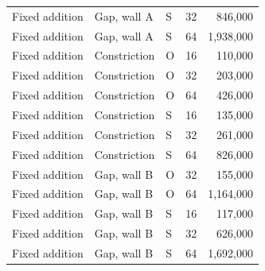 {\begin{longtable}{lllrr}
Fixed addition & Gap, wall A & S & 32 & 846,000\\
Fixed addition & Gap, wall A & S & 64 & 1,938,000\\
Fixed addition & Constriction & O & 16 & 110,000\\
Fixed addition & Constriction & O & 32 & 203,000\\
Fixed addition & Constriction & O & 64 & 426,000\\
Fixed addition & Constriction & S & 16 & 135,000\\
Fixed addition & Constriction & S & 32 & 261,000\\
Fixed addition & Constriction & S & 64 & 826,000\\
Fixed addition & Gap, wall B & O & 32 & 155,000\\
Fixed addition & Gap, wall B & O & 64 & 1,164,000\\
Fixed addition & Gap, wall B & S & 16 & 117,000\\
Fixed addition & Gap, wall B & S & 32 & 626,000\\
Fixed addition & Gap, wall B & S & 64 & 1,692,000\\
\end{longtable}}
